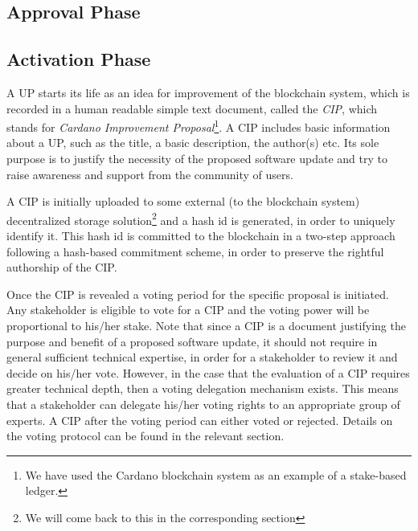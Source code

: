 \subsection{Approval Phase}



\subsection{Activation Phase}

A UP starts its life as an idea for improvement of the blockchain system, which is recorded in a human readable simple text document, called the \emph{CIP}, which stands for \emph{Cardano Improvement Proposal}\footnote{We have used the Cardano \citep{cardano} blockchain system as an example of a stake-based ledger.}. A CIP includes basic information about a UP, such as the title, a basic description, the author(s) etc. Its sole purpose is to justify the necessity of the proposed software update and try to raise awareness and support from the community of users.

A CIP is initially uploaded to some external (to the blockchain system) decentralized storage solution\footnote{We will come back to this in the corresponding section} and a hash id is generated, in order to uniquely identify it. This hash id is committed to the blockchain in a two-step approach following a hash-based commitment scheme, in order to preserve the rightful authorship of the CIP.

Once the CIP is revealed a voting period for the specific proposal is initiated. Any stakeholder is eligible to vote for a CIP and the voting power will be proportional to his/her stake. Note that since a CIP is a document justifying the purpose and benefit of a proposed software update, it should not require in general sufficient technical expertise, in order for a stakeholder to review it and decide on his/her vote. However, in the case that the evaluation of a CIP requires greater technical depth, then a voting delegation mechanism exists. This means that a stakeholder can delegate his/her voting rights to an appropriate group of experts. A CIP after the voting period can either voted or rejected. Details on the voting protocol can be found in the relevant section.


